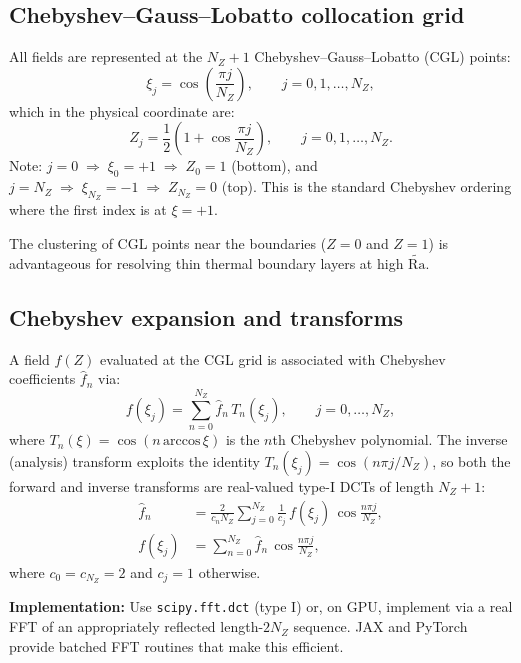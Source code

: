 \documentclass[11pt]{article}
\newcommand{\Rav}{\widetilde{\mathrm{Ra}}}
\begin{document}
\subsection{Chebyshev--Gauss--Lobatto collocation grid}

All fields are represented at the $N_Z + 1$ Chebyshev--Gauss--Lobatto (CGL) points:
\begin{equation}
\xi_j = \cos\!\left(\frac{\pi j}{N_Z}\right), \qquad j = 0, 1, \ldots, N_Z,
\label{eq:cgl_points}
\end{equation}
which in the physical coordinate are:
\begin{equation}
Z_j = \frac{1}{2}\!\left(1 + \cos\!\frac{\pi j}{N_Z}\right), \qquad j = 0, 1, \ldots, N_Z.
\end{equation}
Note: $j = 0 \;\Rightarrow\; \xi_0 = +1 \;\Rightarrow\; Z_0 = 1$ (bottom), and $j = N_Z \;\Rightarrow\; \xi_{N_Z} = -1 \;\Rightarrow\; Z_{N_Z} = 0$ (top). This is the standard Chebyshev ordering where the first index is at $\xi = +1$.

The clustering of CGL points near the boundaries ($Z = 0$ and $Z = 1$) is advantageous for resolving thin thermal boundary layers at high $\Rav$.

\subsection{Chebyshev expansion and transforms}

A field $f(Z)$ evaluated at the CGL grid is associated with Chebyshev coefficients $\hat{f}_n$ via:
\begin{equation}
f(\xi_j) = \sum_{n=0}^{N_Z} \hat{f}_n\, T_n(\xi_j), \qquad j = 0, \ldots, N_Z,
\label{eq:cheb_expansion}
\end{equation}
where $T_n(\xi) = \cos(n\,\mathrm{arccos}\,\xi)$ is the $n$th Chebyshev polynomial. The inverse (analysis) transform exploits the identity $T_n(\xi_j) = \cos(n\pi j/N_Z)$, so both the forward and inverse transforms are real-valued type-I DCTs of length $N_Z + 1$:
\begin{align}
\hat{f}_n &= \frac{2}{c_n N_Z} \sum_{j=0}^{N_Z} \frac{1}{c_j}\, f(\xi_j)\,\cos\!\frac{n\pi j}{N_Z}, \label{eq:analysis}\\
f(\xi_j) &= \sum_{n=0}^{N_Z} \hat{f}_n\,\cos\!\frac{n\pi j}{N_Z}, \label{eq:synthesis}
\end{align}
where $c_0 = c_{N_Z} = 2$ and $c_j = 1$ otherwise.

\textbf{Implementation:} Use \texttt{scipy.fft.dct} (type I) or, on GPU, implement via a real FFT of an appropriately reflected length-$2N_Z$ sequence. JAX and PyTorch provide batched FFT routines that make this efficient.
\end{document}
